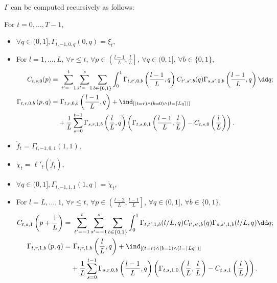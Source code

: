\begin{lemma}\label{lemma:finite_depth_gamma_formal}
$\Gamma$ can be computed recursively as follows:

For $t=0, \ldots, T-1$,
\begin{itemize}
    \item $\forall q\in (0, 1], \Gamma_{t,-1,0,q}(0,q)  = \xi_t$,
    \item For $l=1,\ldots,L$, 
    $\forall r \leq t$, 
    $\forall p \in \left(\frac{l-1}L,\frac lL\right]$,
    $\forall q\in (0,1]$, $\forall b\in \{0, 1\}$,
    \begin{align*} 
     C_{t,s,0}(p)=&~\sum_{t'=-1}^{t}\sum_{s'=-1}^{s}\sum_{b\in\{0,1\}}\int_0^1 \Gamma_{t,t',0,b}\left(\frac{l-1}L,q\right) C_{t',s',b}(q)\Gamma_{s,s',0,b}\left(\frac{l-1}L,q\right) \dd q;\\
     \Gamma_{t,r,0,b}\left(p, q\right) = &~\Gamma_{t,r,0,b}\left(\frac{l-1}L, q\right) + \ind_{[(t=r) \wedge (b=0) \wedge (l=\lceil L q\rceil)]} \\
     & + \frac1L \sum_{s=0}^{t-1} \Gamma_{s,r,1,b}\left(\frac l L, q\right)\left(\Gamma_{t,s,0,1}\left(\frac{l-1}L, \frac l L\right)-C_{t,s,0}\left(\frac l L\right)\right).
    \end{align*}
    \item $\mathring f_t = \Gamma_{t,-1,0,1}(1, 1)$,
    \item $\mathring \chi_t = \ell'_t(\mathring f_t)$,
    \item $\forall q\in (0, 1], \Gamma_{t, -1, 1, 1}(1, q)=\mathring \chi_t$,
    \item For $l=L,\ldots,1$, 
    $\forall r \leq t$, 
    $\forall p \in \left(\frac{l-2}L,\frac{l-1} L\right]$,
    $\forall q\in (0,1]$, $\forall b\in \{0, 1\}$,
    \begin{align*}
        C_{t,s,1}\left(p+\frac1L\right)=&~\sum_{t'=-1}^{t}\sum_{s'=-1}^{s}\sum_{b\in\{0,1\}}\int_0^1 \Gamma_{t,t',1,b}(l/L,q) C_{t',s',b}(q)\Gamma_{s,s',1,b}(l/L,q) \dd q;\\
     \Gamma_{t,r,1,b}\left(p, q\right) = &~\Gamma_{t,r,1,b}\left(\frac{l}L, q\right) + \ind_{[(t=r) \wedge (b=1) \wedge (l=\lceil L q\rceil)]} \\
     & + \frac1L \sum_{s=0}^{t-1} \Gamma_{s,r,0,b}\left(\frac {l-1} L, q\right)\left(\Gamma_{t,s,1,0}\left(\frac{l}L, \frac l L\right)-C_{t,s,1}\left(\frac l L\right)\right).\\
     \end{align*}
\end{itemize}
\end{lemma}

